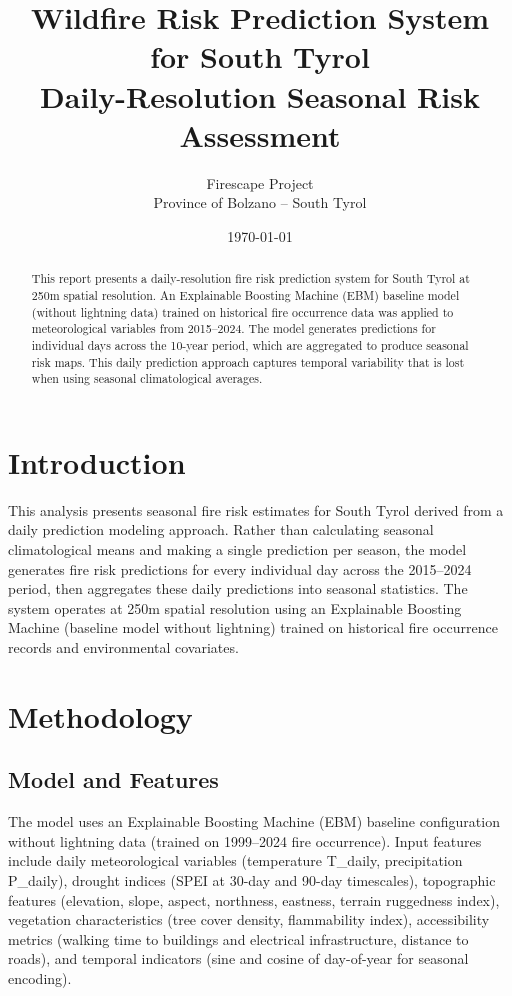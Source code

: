 \documentclass[11pt,a4paper]{article}
\title{\textbf{Wildfire Risk Prediction System for South Tyrol}\\
\large Daily-Resolution Seasonal Risk Assessment}
\author{
    Firescape Project\\
    Province of Bolzano -- South Tyrol
}
\date{\today}
\begin{document}
\maketitle

\begin{abstract}
This report presents a daily-resolution fire risk prediction system for South Tyrol at 250m spatial resolution. An Explainable Boosting Machine (EBM) baseline model (without lightning data) trained on historical fire occurrence data was applied to meteorological variables from 2015--2024. The model generates predictions for individual days across the 10-year period, which are aggregated to produce seasonal risk maps. This daily prediction approach captures temporal variability that is lost when using seasonal climatological averages.
\end{abstract}

\section{Introduction}

This analysis presents seasonal fire risk estimates for South Tyrol derived from a daily prediction modeling approach. Rather than calculating seasonal climatological means and making a single prediction per season, the model generates fire risk predictions for every individual day across the 2015--2024 period, then aggregates these daily predictions into seasonal statistics. The system operates at 250m spatial resolution using an Explainable Boosting Machine (baseline model without lightning) trained on historical fire occurrence records and environmental covariates.

\section{Methodology}

\subsection{Model and Features}

The model uses an Explainable Boosting Machine (EBM) baseline configuration without lightning data (trained on 1999--2024 fire occurrence). Input features include daily meteorological variables (temperature T\_daily, precipitation P\_daily), drought indices (SPEI at 30-day and 90-day timescales), topographic features (elevation, slope, aspect, northness, eastness, terrain ruggedness index), vegetation characteristics (tree cover density, flammability index), accessibility metrics (walking time to buildings and electrical infrastructure, distance to roads), and temporal indicators (sine and cosine of day-of-year for seasonal encoding).
\end{document}
